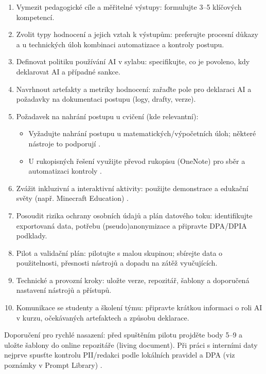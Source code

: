 \documentclass{report}%
\begin{document}
\begin{enumerate}
  \item[1.] [\ ] Vymezit pedagogické cíle a měřitelné výstupy: formulujte 3–5 klíčových kompetencí.
  \item[2.] [\ ] Zvolit typy hodnocení a jejich vztah k výstupům: preferujte procesní důkazy a u technických úloh kombinaci automatizace a kontroly postupu.
  \item[3.] [\ ] Definovat politiku používání AI v sylabu: specifikujte, co je povoleno, kdy deklarovat AI a případné sankce.
  \item[4.] [\ ] Navrhnout artefakty a metriky hodnocení: zařaďte pole pro deklaraci AI a požadavky na dokumentaci postupu (logy, drafty, verze).
  \item[5.] [\ ] Požadavek na nahrání postupu u cvičení (kde relevantní):
    \begin{itemize}
      \item Vyžadujte nahrání postupu u matematických/výpočetních úloh; některé nástroje to podporují \cite{kb_ai_101_tipu_pdf_04e4a115_page_8_1}.
      \item U rukopisných řešení využijte převod rukopisu (OneNote) pro sběr a automatizaci kontroly \cite{kb_ai_101_tipu_pdf_04e4a115_page_8_1}.
    \end{itemize}
  \item[6.] [\ ] Zvážit inkluzivní a interaktivní aktivity: použijte demonstrace a edukační světy (např. Minecraft Education) \cite{kb_ai_101_tipu_pdf_04e4a115_page_15_2}.
  \item[7.] [\ ] Posoudit rizika ochrany osobních údajů a plán datového toku: identifikujte exportovaná data, potřebu (pseudo)anonymizace a připravte DPA/DPIA podklady.
  \item[8.] [\ ] Pilot a validační plán: pilotujte s malou skupinou; sbírejte data o použitelnosti, přesnosti nástrojů a dopadu na zátěž vyučujících.
  \item[9.] [\ ] Technické a provozní kroky: uložte verze, repozitář, šablony a doporučená nastavení nástrojů a přístupů.
  \item[10.] [\ ] Komunikace se studenty a školení týmu: připravte krátkou informaci o roli AI v kurzu, očekávaných artefaktech a způsobu deklarace.
\end{enumerate}

Doporučení pro rychlé nasazení: před spuštěním pilotu projděte body 5–9 a uložte šablony do online repozitáře (living document). Při práci s interními daty nejprve spusťte kontrolu PII/redakci podle lokálních pravidel a DPA (viz poznámky v Prompt Library) \cite{kb_ai_101_tipu_pdf_04e4a115_page_15_2, kb_ai_101_tipu_pdf_04e4a115_page_8_1}.%
\end{document}
